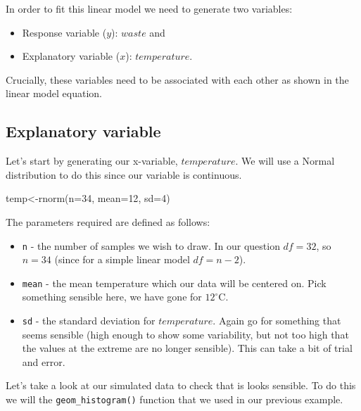 \documentclass[
]{book}
\newenvironment{Shaded}{\begin{snugshade}}{\end{snugshade}}
\newcommand{\AttributeTok}[1]{\textcolor[rgb]{0.77,0.63,0.00}{#1}}
\newcommand{\DecValTok}[1]{\textcolor[rgb]{0.00,0.00,0.81}{#1}}
\newcommand{\FunctionTok}[1]{\textcolor[rgb]{0.00,0.00,0.00}{#1}}
\newcommand{\NormalTok}[1]{#1}
\newcommand{\OtherTok}[1]{\textcolor[rgb]{0.56,0.35,0.01}{#1}}
\providecommand{\tightlist}{%
  \setlength{\itemsep}{0pt}\setlength{\parskip}{0pt}}
\begin{document}
In order to fit this linear model we need to generate two variables:

\begin{itemize}
\tightlist
\item
  Response variable (\(y\)): \(waste\) and
\item
  Explanatory variable (\(x\)): \(temperature\).
\end{itemize}

Crucially, these variables need to be associated with each other as shown in the linear model equation.

\hypertarget{explanatory-variable}{%
\subsection{Explanatory variable}\label{explanatory-variable}}

Let's start by generating our x-variable, \(temperature\). We will use a Normal distribution to do this since our variable is continuous.

\begin{Shaded}
\begin{Highlighting}[]
\NormalTok{temp}\OtherTok{\textless{}{-}}\FunctionTok{rnorm}\NormalTok{(}\AttributeTok{n=}\DecValTok{34}\NormalTok{, }\AttributeTok{mean=}\DecValTok{12}\NormalTok{, }\AttributeTok{sd=}\DecValTok{4}\NormalTok{)}
\end{Highlighting}
\end{Shaded}

The parameters required are defined as follows:

\begin{itemize}
\tightlist
\item
  \texttt{n} - the number of samples we wish to draw. In our question \(df=32\), so \(n=34\) (since for a simple linear model \(df=n-2\)).
\item
  \texttt{mean} - the mean temperature which our data will be centered on. Pick something sensible here, we have gone for \(12^{\circ}\)C.
\item
  \texttt{sd} - the standard deviation for \(temperature\). Again go for something that seems sensible (high enough to show some variability, but not too high that the values at the extreme are no longer sensible). This can take a bit of trial and error.
\end{itemize}

Let's take a look at our simulated data to check that is looks sensible. To do this we will the \texttt{geom\_histogram()} function that we used in our previous example.
\end{document}
